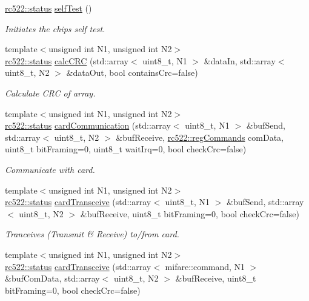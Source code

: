 \begin{DoxyCompactItemize}
\hyperlink{classspiReader_a4bcf984823c38cf4841ebf619e788790}{rc522\+::status} \hyperlink{classrc522_ae2b0fd03ac296593e4b031a0308e3233}{self\+Test} ()
\begin{DoxyCompactList}\small\item\em Initiates the chips self test. \end{DoxyCompactList}\item 
{\footnotesize template$<$unsigned int N1, unsigned int N2$>$ }\\\hyperlink{classspiReader_a4bcf984823c38cf4841ebf619e788790}{rc522\+::status} \hyperlink{classrc522_a6d3fe62ea90de72aa783331cf21f54fe}{calc\+C\+RC} (std\+::array$<$ uint8\+\_\+t, N1 $>$ \&data\+In, std\+::array$<$ uint8\+\_\+t, N2 $>$ \&data\+Out, bool contains\+Crc=false)
\begin{DoxyCompactList}\small\item\em Calculate C\+RC of array. \end{DoxyCompactList}\item 
{\footnotesize template$<$unsigned int N1, unsigned int N2$>$ }\\\hyperlink{classspiReader_a4bcf984823c38cf4841ebf619e788790}{rc522\+::status} \hyperlink{classrc522_a4034678819a3442934c55ba5c2f2588d}{card\+Communication} (std\+::array$<$ uint8\+\_\+t, N1 $>$ \&buf\+Send, std\+::array$<$ uint8\+\_\+t, N2 $>$ \&buf\+Receive, \hyperlink{classrc522_a3a205976fb9b7265bc5b7971215fbb7c}{rc522\+::reg\+Commands} com\+Data, uint8\+\_\+t bit\+Framing=0, uint8\+\_\+t wait\+Irq=0, bool check\+Crc=false)
\begin{DoxyCompactList}\small\item\em Communicate with card. \end{DoxyCompactList}\item 
{\footnotesize template$<$unsigned int N1, unsigned int N2$>$ }\\\hyperlink{classspiReader_a4bcf984823c38cf4841ebf619e788790}{rc522\+::status} \hyperlink{classrc522_adcad63b7a87430ae943c833bcd9e24ab}{card\+Transceive} (std\+::array$<$ uint8\+\_\+t, N1 $>$ \&buf\+Send, std\+::array$<$ uint8\+\_\+t, N2 $>$ \&buf\+Receive, uint8\+\_\+t bit\+Framing=0, bool check\+Crc=false)
\begin{DoxyCompactList}\small\item\em Tranceives (Transmit \& Receive) to/from card. \end{DoxyCompactList}\item 
{\footnotesize template$<$unsigned int N1, unsigned int N2$>$ }\\\hyperlink{classspiReader_a4bcf984823c38cf4841ebf619e788790}{rc522\+::status} \hyperlink{classrc522_a4aa6f24387944a7aee98398dd300b7a0}{card\+Transceive} (std\+::array$<$ mifare\+::command, N1 $>$ \&buf\+Com\+Data, std\+::array$<$ uint8\+\_\+t, N2 $>$ \&buf\+Receive, uint8\+\_\+t bit\+Framing=0, bool check\+Crc=false)

\end{DoxyCompactItemize}
